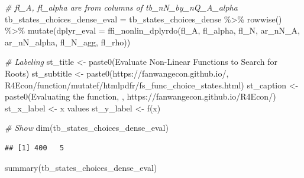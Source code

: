 \documentclass[
]{book}
\newenvironment{Shaded}{\begin{snugshade}}{\end{snugshade}}
\newcommand{\AttributeTok}[1]{\textcolor[rgb]{0.77,0.63,0.00}{#1}}
\newcommand{\CommentTok}[1]{\textcolor[rgb]{0.56,0.35,0.01}{\textit{#1}}}
\newcommand{\FunctionTok}[1]{\textcolor[rgb]{0.00,0.00,0.00}{#1}}
\newcommand{\NormalTok}[1]{#1}
\newcommand{\OtherTok}[1]{\textcolor[rgb]{0.56,0.35,0.01}{#1}}
\newcommand{\SpecialCharTok}[1]{\textcolor[rgb]{0.00,0.00,0.00}{#1}}
\newcommand{\StringTok}[1]{\textcolor[rgb]{0.31,0.60,0.02}{#1}}
\begin{document}
\begin{Shaded}
\begin{Highlighting}[]
\CommentTok{\# fl\_A, fl\_alpha are from columns of tb\_nN\_by\_nQ\_A\_alpha}
\NormalTok{tb\_states\_choices\_dense\_eval }\OtherTok{=}\NormalTok{ tb\_states\_choices\_dense }\SpecialCharTok{\%\textgreater{}\%} \FunctionTok{rowwise}\NormalTok{() }\SpecialCharTok{\%\textgreater{}\%}
                        \FunctionTok{mutate}\NormalTok{(}\AttributeTok{dplyr\_eval =} \FunctionTok{ffi\_nonlin\_dplyrdo}\NormalTok{(fl\_A, fl\_alpha, fl\_N,}
\NormalTok{                                                               ar\_nN\_A, ar\_nN\_alpha,}
\NormalTok{                                                               fl\_N\_agg, fl\_rho))}
\end{Highlighting}
\end{Shaded}

\begin{Shaded}
\begin{Highlighting}[]
\CommentTok{\# Labeling}
\NormalTok{st\_title }\OtherTok{\textless{}{-}} \FunctionTok{paste0}\NormalTok{(}\StringTok{\textquotesingle{}Evaluate Non{-}Linear Functions to Search for Roots\textquotesingle{}}\NormalTok{)}
\NormalTok{st\_subtitle }\OtherTok{\textless{}{-}} \FunctionTok{paste0}\NormalTok{(}\StringTok{\textquotesingle{}https://fanwangecon.github.io/\textquotesingle{}}\NormalTok{,}
                      \StringTok{\textquotesingle{}R4Econ/function/mutatef/htmlpdfr/fs\_func\_choice\_states.html\textquotesingle{}}\NormalTok{)}
\NormalTok{st\_caption }\OtherTok{\textless{}{-}} \FunctionTok{paste0}\NormalTok{(}\StringTok{\textquotesingle{}Evaluating the function, \textquotesingle{}}\NormalTok{,}
                     \StringTok{\textquotesingle{}https://fanwangecon.github.io/R4Econ/\textquotesingle{}}\NormalTok{)}
\NormalTok{st\_x\_label }\OtherTok{\textless{}{-}} \StringTok{\textquotesingle{}x values\textquotesingle{}}
\NormalTok{st\_y\_label }\OtherTok{\textless{}{-}} \StringTok{\textquotesingle{}f(x)\textquotesingle{}}

\CommentTok{\# Show}
\FunctionTok{dim}\NormalTok{(tb\_states\_choices\_dense\_eval)}
\end{Highlighting}
\end{Shaded}

\begin{verbatim}
## [1] 400   5
\end{verbatim}

\begin{Shaded}
\begin{Highlighting}[]
\FunctionTok{summary}\NormalTok{(tb\_states\_choices\_dense\_eval)}
\end{Highlighting}
\end{Shaded}
\end{document}
